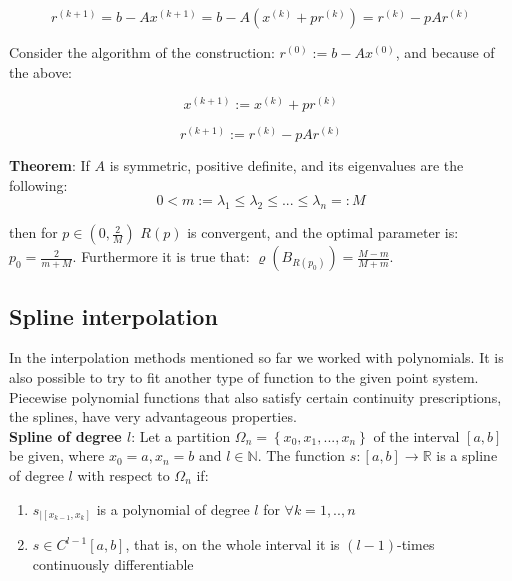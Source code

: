 \documentclass[margin=0px]{article}
\begin{document}
\begin{displaymath}
    r^{(k+1)} = b - Ax^{(k+1)} = b - A(x^{(k)} + pr^{(k)}) = r^{(k)} - pAr^{(k)}
\end{displaymath}

\noindent Consider the algorithm of the construction: $r^{(0)} := b - Ax^{(0)}$, and because of the above:

\begin{displaymath}
    x^{(k+1)} := x^{(k)} + pr^{(k)}
\end{displaymath}

\begin{displaymath}
    r^{(k+1)} := r^{(k)} - pAr^{(k)}
\end{displaymath}

\noindent \textbf{Theorem}: If $A$ is symmetric, positive definite, and its eigenvalues are the following:
\begin{displaymath}
    0 < m := \lambda_{1} \leq \lambda_{2} \leq ... \leq \lambda_{n} =: M
\end{displaymath}

\noindent then for $p \in (0,\frac{2}{M})$ $R(p)$ is convergent, and the optimal parameter is: $p_{0} = \frac{2}{m + M}$.
Furthermore it is true that: $\varrho(B_{R(p_{0})}) = \frac{M - m}{M + m}$.

\subsection{Spline interpolation}

In the interpolation methods mentioned so far we worked with polynomials. It is also possible to try to fit another
type of function to the given point system. Piecewise polynomial functions that also satisfy certain continuity prescriptions,
the splines, have very advantageous properties.\\

\noindent \textbf{Spline of degree $l$}: Let a partition $\Omega_{n} = \left\{x_{0}, x_{1}, ..., x_{n}\right\}$ of the interval $[a,b]$ be given,
where $x_{0}=a, x_{n}=b$ and $l \in \mathbb{N}$. The function $s:[a,b] \to \mathbb{R}$ is a spline of degree $l$ with respect to
$\Omega_{n}$ if:

\begin{enumerate}
    \item	$s_{|[x_{k-1},x_{k}]}$ is a polynomial of degree $l$ for $\forall k = 1,..,n$

    \item	$s \in C^{l-1}[a,b]$, that is, on the whole interval it is $(l-1)$-times continuously differentiable
\end{enumerate}
\end{document}

